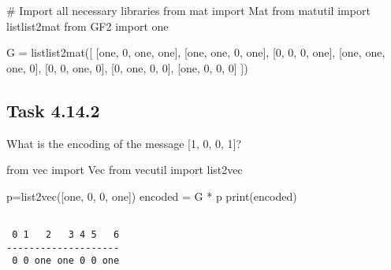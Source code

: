 \documentclass[
  letterpaper,
  DIV=11,
  numbers=noendperiod]{scrartcl}
\newenvironment{Shaded}{\begin{snugshade}}{\end{snugshade}}
\newcommand{\BuiltInTok}[1]{\textcolor[rgb]{0.00,0.23,0.31}{#1}}
\newcommand{\CommentTok}[1]{\textcolor[rgb]{0.37,0.37,0.37}{#1}}
\newcommand{\DecValTok}[1]{\textcolor[rgb]{0.68,0.00,0.00}{#1}}
\newcommand{\ImportTok}[1]{\textcolor[rgb]{0.00,0.46,0.62}{#1}}
\newcommand{\NormalTok}[1]{\textcolor[rgb]{0.00,0.23,0.31}{#1}}
\newcommand{\OperatorTok}[1]{\textcolor[rgb]{0.37,0.37,0.37}{#1}}
\begin{document}
\begin{Shaded}
\begin{Highlighting}[numbers=left,,]
\CommentTok{\# Import all necessary libraries}
\ImportTok{from}\NormalTok{ mat }\ImportTok{import}\NormalTok{ Mat}
\ImportTok{from}\NormalTok{ matutil }\ImportTok{import}\NormalTok{ listlist2mat}
\ImportTok{from}\NormalTok{ GF2 }\ImportTok{import}\NormalTok{ one}

\NormalTok{G }\OperatorTok{=}\NormalTok{ listlist2mat([}
\NormalTok{  [one, }\DecValTok{0}\NormalTok{, one, one],}
\NormalTok{  [one, one, }\DecValTok{0}\NormalTok{, one],}
\NormalTok{  [}\DecValTok{0}\NormalTok{, }\DecValTok{0}\NormalTok{, }\DecValTok{0}\NormalTok{, one],}
\NormalTok{  [one, one, one, }\DecValTok{0}\NormalTok{],}
\NormalTok{  [}\DecValTok{0}\NormalTok{, }\DecValTok{0}\NormalTok{, one, }\DecValTok{0}\NormalTok{],}
\NormalTok{  [}\DecValTok{0}\NormalTok{, one, }\DecValTok{0}\NormalTok{, }\DecValTok{0}\NormalTok{],}
\NormalTok{  [one, }\DecValTok{0}\NormalTok{, }\DecValTok{0}\NormalTok{, }\DecValTok{0}\NormalTok{]}
\NormalTok{])}
\end{Highlighting}
\end{Shaded}

\hypertarget{task-4.14.2}{%
\subsection{Task 4.14.2}\label{task-4.14.2}}

What is the encoding of the message {[}1, 0, 0, 1{]}?

\begin{Shaded}
\begin{Highlighting}[numbers=left,,]
\ImportTok{from}\NormalTok{ vec }\ImportTok{import}\NormalTok{ Vec}
\ImportTok{from}\NormalTok{ vecutil }\ImportTok{import}\NormalTok{ list2vec}

\NormalTok{p}\OperatorTok{=}\NormalTok{list2vec([one, }\DecValTok{0}\NormalTok{, }\DecValTok{0}\NormalTok{, one])}
\NormalTok{encoded }\OperatorTok{=}\NormalTok{ G }\OperatorTok{*}\NormalTok{ p}
\BuiltInTok{print}\NormalTok{(encoded)}
\end{Highlighting}
\end{Shaded}

\begin{lstlisting}

 0 1   2   3 4 5   6
--------------------
 0 0 one one 0 0 one
\end{lstlisting}

\newpage{}
\end{document}
